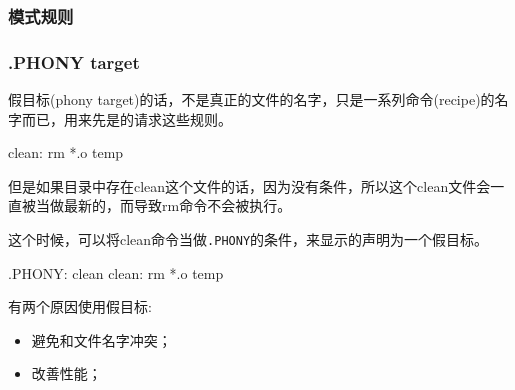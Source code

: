 \subsubsection{模式规则}

\subsubsection{.PHONY target}

假目标(phony target)的话，不是真正的文件的名字，只是一系列命令(recipe)的名字而已，用来先是的请求这些规则。

\begin{Bash}
clean:
	rm *.o temp
\end{Bash}


但是如果目录中存在clean这个文件的话，因为没有条件，所以这个clean文件会一直被当做最新的，而导致rm命令不会被执行。

这个时候，可以将clean命令当做\lstinline$.PHONY$的条件，来显示的声明为一个假目标。
\begin{Bash}
.PHONY: clean
clean:
	rm *.o temp
\end{Bash}

有两个原因使用假目标: 
\begin{itemize}
\item 避免和文件名字冲突；
\item 改善性能；
\end{itemize}
